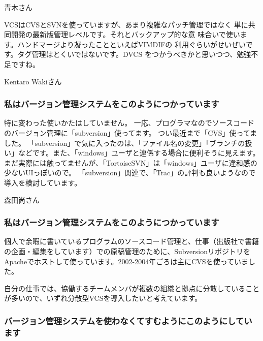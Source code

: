 \documentclass[cjk,dvipdfmx,12pt]{beamer}
\begin{document}
\begin{frame}{青木さん}

VCSはCVSとSVNを使っていますが、あまり複雑なパッチ管理ではなく
単に共同開発の最新版管理レベルです。それとバックアップ的な意
味合いで使います。ハンドマージより凝ったことといえばVIMDIFの
利用ぐらいがせいぜいです。タグ管理はとくいではないです。DVCS
をつかうべきかと思いつつ、勉強不足ですね。

\end{frame}\begin{frame}{Kentaro Wakiさん}
\subsubsection{私はバージョン管理システムをこのようにつかっています}

特に変わった使いかたはしていません。
一応、プログラマなのでソースコードのバージョン管理に「subversion」使ってます。
つい最近まで「CVS」使ってました。
「subversion」で気に入ったのは、「ファイル名の変更」「ブランチの扱い」などです。また、「windows」ユーザと連係する場合に便利そうに見えます。
まだ実際には触ってませんが、「TortoiseSVN」は「windows」ユーザに違和感の少ないUIっぽいので。
「subversion」関連で、「Trac」の評判も良いようなので導入を検討しています。

\end{frame}\begin{frame}{森田尚さん}

\subsubsection{私はバージョン管理システムをこのようにつかっています}

個人で余暇に書いているプログラムのソースコード管理と、仕事（出版社で書籍
の企画・編集をしています）での原稿管理のために、Subversionリポジトリを
Apacheでホストして使っています。2002-2004年ごろは主にCVSを使っていました。

自分の仕事では、協働するチームメンバが複数の組織と拠点に分散していること
が多いので、いずれ分散型VCSを導入したいと考えています。

\subsubsection{バージョン管理システムを使わなくてすむようにこのようにしています}


\end{frame}
\end{document}
